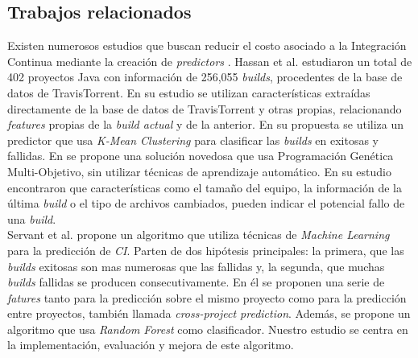 \subsection{Trabajos relacionados}
Existen numerosos estudios que buscan reducir el costo asociado a la Integración Continua
mediante la creación de \textit{predictors} \cite{8,5,2,18,7,17,4,1,22}. Hassan et al. \cite{8}
estudiaron un total de 402 proyectos Java con información de 256,055 \textit{builds}, procedentes
de la base de datos de TravisTorrent. En su estudio se utilizan características extraídas
directamente de la base de datos de TravisTorrent y otras propias, relacionando \textit{features}
propias de la \textit{build actual} y de la anterior. En su propuesta se utiliza un predictor
que usa \textit{K-Mean Clustering} para clasificar las \textit{builds} en exitosas y fallidas.
En \cite{5} se propone una solución novedosa que usa Programación Genética Multi-Objetivo, sin
utilizar técnicas de aprendizaje automático. En su estudio encontraron que características
como el tamaño del equipo, la información de la última \textit{build} o el tipo de archivos
cambiados, pueden indicar el potencial fallo de una \textit{build}.\\

Servant et al. \cite{2} propone un algoritmo que utiliza técnicas de \textit{Machine Learning}
para la predicción de \textit{CI}. Parten de dos hipótesis principales: la primera, que las
\textit{builds} exitosas son mas numerosas que las fallidas y, la segunda, que muchas
\textit{builds} fallidas se producen consecutivamente. En él se proponen una serie de
\textit{fatures} tanto para la predicción sobre el mismo proyecto como para la predicción
entre proyectos, también llamada \textit{cross-project prediction}. Además, se propone un
algoritmo que usa \textit{Random Forest} como clasificador. Nuestro estudio se centra en
la implementación, evaluación y mejora de este algoritmo.\\


